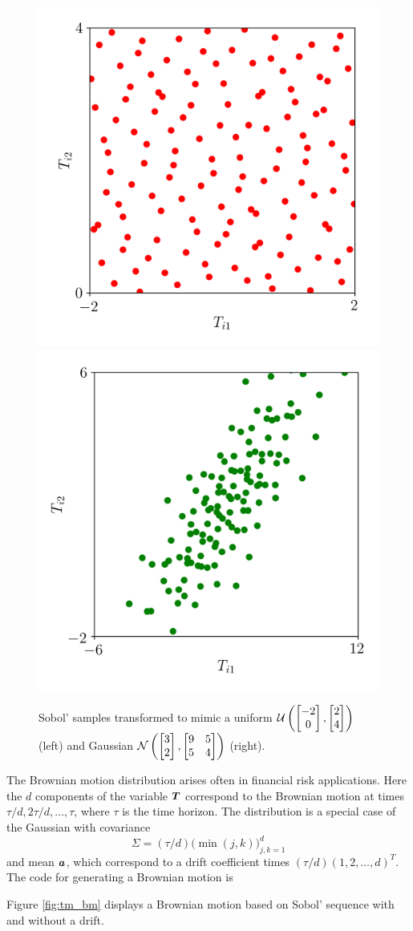 \documentclass[graybox,footinfo]{svmult}
\newcommand{\mSigma}{\mathsf{\Sigma}}
\begin{document}
\begin{figure}
	\includegraphics[width=.45\textwidth]{QMCSoftwareArticle/figs/tm_uniform.png} 
	\includegraphics[width=.45\textwidth]{QMCSoftwareArticle/figs/tm_gaussian.png}
	\caption{Sobol' samples transformed to mimic a uniform ${\mathcal{U}}\left(\begin{bmatrix} -2 \\ 0 \end{bmatrix}, \begin{bmatrix} 2 \\ 4 \end{bmatrix} \right)$ (left) and  Gaussian ${\mathcal{N}}\left(\begin{bmatrix} 3 \\ 2 \end{bmatrix}, \begin{bmatrix} 9 & 5 \\ 5 & 4 \end{bmatrix} \right)$ (right).}
	\label{fig:tm_ug}
\end{figure}

The Brownian motion distribution arises often in financial risk applications.  Here the $d$ components of the variable ${\boldsymbol{T}}$ correspond to the Brownian motion at times $\tau/d, 2\tau/d, \ldots, \tau$, where $\tau$ is the time horizon.  The distribution is a special case of the Gaussian with covariance 
\begin{equation} \label{eq:BMcov}
	\mSigma = (\tau/d) \bigl (\min(j,k) \bigr)_{j,k=1}^d
\end{equation}
and mean ${\boldsymbol{a}}$, which  correspond to a drift coefficient times $(\tau/d)(1, 2, \ldots, d)^T$. The code for generating a Brownian motion is

Figure \ref{fig:tm_bm} displays a Brownian motion based on Sobol' sequence with and without a drift.
\end{document}
